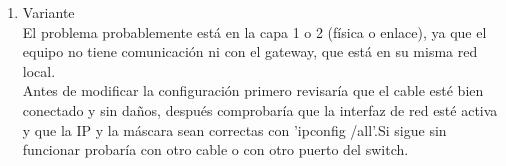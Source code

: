 \begin{enumerate}[label=\arabic*., leftmargin=*]
    \item Variante\\
    El problema probablemente está en la capa 1 o 2 (física o enlace), ya que el equipo no tiene 
    comunicación ni con el gateway, que está en su misma red local. \\
    Antes de modificar la configuración primero revisaría que el cable esté bien conectado y sin daños, 
    después comprobaría que la interfaz de red est\'e activa y que la IP y la máscara sean 
    correctas con 'ipconfig /all'.Si sigue sin funcionar probaría con otro cable o con otro puerto del switch.

\end{enumerate}
